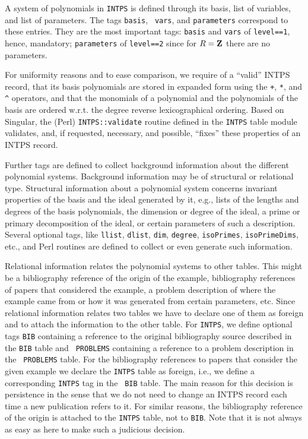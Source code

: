 \documentclass[11pt,a4paper]{article}
\begin{document}
A system of polynomials in {\tt INTPS} is defined through its basis,
list of variables, and list of parameters. The tags {\tt basis}, {\tt
vars}, and {\tt parameters} correspond to these entries. They are the
most important tags: {\tt basis} and {\tt vars} of {\tt level==1},
hence, mandatory; {\tt parameters} of {\tt level==2} since for $R={\bf
Z}$ there are no parameters.  

For uniformity reasons and to ease comparison, we require of a
``valid'' INTPS record, that its basis polynomials are stored in
expanded form using the \verb?+?, \verb?*?, and \verb?^? operators,
and that the monomials of a polynomial and the polynomials of the
basis are ordered w.r.t. the degree reverse lexicographical
ordering. Based on {\sc Singular}, the (Perl) {\tt INTPS::validate}
routine defined in the {\tt INTPS} table module validates, and, if
requested, necessary, and possible, ``fixes'' these properties of an
INTPS record.

Further tags are defined to collect background information about the
different polynomial systems. Background information may be of
structural or relational type. Structural information about a
polynomial system concerns invariant properties of the basis and the
ideal generated by it, e.g., lists of the lengths and degrees of the
basis polynomials, the dimension or degree of the ideal, a prime or
primary decomposition of the ideal, or certain parameters of such a
description.  Several optional tags, like {\tt llist}, {\tt dlist},
{\tt dim}, {\tt degree}, {\tt isoPrimes}, {\tt isoPrimeDims}, etc.,
and Perl routines are defined to collect or even generate such
information.

Relational information relates the polynomial systems to other tables.
This might be a bibliography reference of the origin of the example,
bibliography references of papers that considered the example, a
problem description of where the example came from or how it was
generated from certain parameters, etc. Since relational information
relates two tables we have to declare one of them as foreign and to
attach the information to the other table. For {\tt INTPS}, we define
optional tags {\tt BIB} containing a reference to the original
bibliography source described in the {\tt BIB} table and {\tt
PROBLEMS} containing a reference to a problem description in the {\tt
PROBLEMS} table.  For the bibliography references to papers that
consider the given example we declare the {\tt INTPS} table as
foreign, i.e., we define a corresponding {\tt INTPS} tag in the {\tt
BIB} table.  The main reason for this decision is persistence in the
sense that we do not need to change an INTPS record each time a new
publication refers to it.  For similar reasons, the bibliography
reference of the origin is attached to the {\tt INTPS} table, not to
{\tt BIB}. Note that it is not always as easy as here to make such a
judicious decision.
\end{document}

